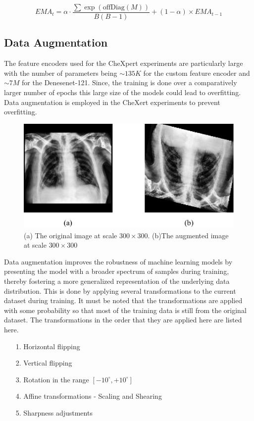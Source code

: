 \documentclass[12pt,DIV14,BCOR12mm,a4paper,footinclude=false,headinclude,parskip=half-,twoside,openright,cleardoublepage=empty,toc=index,bibliography=totoc,listof=totoc]{scrreprt}
\numberwithin{equation}{chapter}
\begin{document}
\begin{equation}\label{eq:EMA}
EMA_t = \alpha \cdot \frac{\sum \exp\left(\text{offDiag}(M)\right)}{B(B-1)} + (1 - \alpha) \times EMA_{t-1}
\end{equation}

\subsection{Data Augmentation}

The feature encoders used for the CheXpert experiments are particularly large with the number of parameters being $\sim135K$ for the custom feature encoder and $\sim7M$ for the Denesenet-121. Since, the training is done over a comparatively larger number of epochs this large size of the models could lead to overfitting. Data augmentation is employed in the CheXert experiments to prevent overfitting.

\begin{figure}[htbp]
\centering
\includegraphics[width=0.8\linewidth]{thesis/figures/augmentation.pdf}
\caption{(a) The original image at scale $300\times300$. (b)The augmented image at scale $300\times300$}
\end{figure}

Data augmentation improves the robustness of machine learning models by presenting the model with a broader spectrum of samples during training, thereby fostering a more generalized representation of the underlying data distribution. This is done by applying several transformations to the current dataset during training. It must be noted that the transformations are applied with some probability so that most of the training data is still from the original dataset. The transformations in the order that they are applied here are listed here.

\begin{itemize}
    \item[1.] Horizontal flipping
    \item[2.] Vertical flipping
    \item[3.] Rotation in the range $[-10^\circ,+10^\circ]$
    \item[4.] Affine transformations - Scaling and Shearing
    \item[5.] Sharpness adjustments
\end{itemize}
\end{document}
